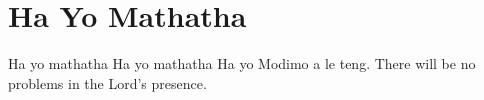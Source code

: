 \starttocol
\chapter{Ha Yo Mathatha}
\nexttocol
\hfill{\it }
\stoptocol
\starttocol
\startlines
{\sc Ha} yo mathatha
Ha yo mathatha
Ha yo Modimo a le teng.
\stoplines
\nexttocol
There will be no problems in the Lord's presence.
\stoptocol
